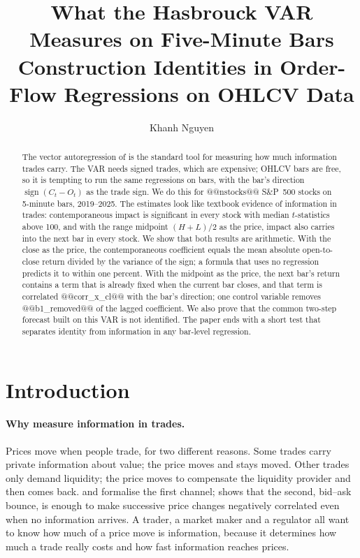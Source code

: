 \documentclass[11pt,a4paper]{article}
\title{\textbf{What the Hasbrouck VAR Measures on Five-Minute Bars}\\[0.4em]
\large Construction Identities in Order-Flow Regressions on OHLCV Data}
\author{Khanh Nguyen}
\date{}
\begin{document}
\maketitle

\begin{abstract}
\noindent The vector autoregression of \citet{hasbrouck1991} is the standard tool for measuring how much
information trades carry. The VAR needs signed trades, which are expensive; OHLCV bars are free, so it is
tempting to run the same regressions on bars, with the bar's direction $\operatorname{sign}(C_t-O_t)$ as
the trade sign. We do this for @@nstocks@@ S\&P~500 stocks on 5-minute bars, 2019--2025. The estimates
look like textbook evidence of information in trades: contemporaneous impact is significant in every
stock with median $t$-statistics above 100, and with the range midpoint $(H+L)/2$ as the price, impact
also carries into the next bar in every stock. We show that both results are arithmetic. With the
close as the price, the contemporaneous coefficient equals the mean absolute open-to-close return
divided by the variance of the sign; a formula that uses no regression predicts it to within one
percent. With the midpoint as the price, the next bar's return contains a term that is already fixed
when the current bar closes, and that term is correlated @@corr_x_cl@@ with the bar's direction; one
control variable removes @@b1_removed@@ of the lagged coefficient. We also prove that the common two-step
forecast built on this VAR is not identified. The paper ends with a short test that separates identity
from information in any bar-level regression.
\end{abstract}

\section{Introduction}
\label{sec:intro}

\paragraph{Why measure information in trades.} Prices move when people trade, for two different
reasons. Some trades carry private information about value; the price moves and stays moved. Other
trades only demand liquidity; the price moves to compensate the liquidity provider and then comes back.
\citet{kyle1985} and \citet{glosten1985} formalise the first channel; \citet{roll1984} shows that the
second, bid--ask bounce, is enough to make successive price changes negatively correlated even when no
information arrives. A trader, a market maker and a regulator all want to know how much of a price move
is information, because it determines how much a trade really costs and how fast information reaches
prices.
\end{document}
